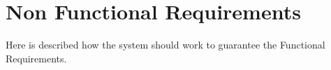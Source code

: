 \section{Non Functional Requirements}
Here is described how the system should work to guarantee the Functional Requirements.

		

		

		

		